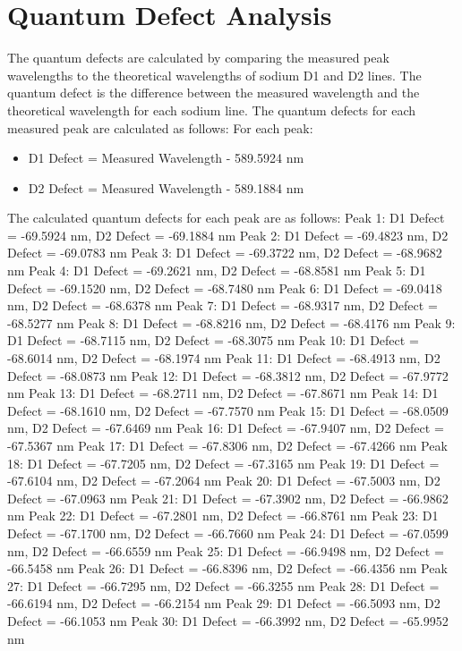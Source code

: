 \documentclass{article}
\begin{document}
\section*{Quantum Defect Analysis}
The quantum defects are calculated by comparing the measured peak wavelengths to the theoretical wavelengths of sodium D1 and D2 lines. The quantum defect is the difference between the measured wavelength and the theoretical wavelength for each sodium line. The quantum defects for each measured peak are calculated as follows:
For each peak:
\begin{itemize}
\item D1 Defect = Measured Wavelength - 589.5924 nm
\item D2 Defect = Measured Wavelength - 589.1884 nm
\end{itemize}
The calculated quantum defects for each peak are as follows:
Peak 1: D1 Defect = -69.5924 nm, D2 Defect = -69.1884 nm
Peak 2: D1 Defect = -69.4823 nm, D2 Defect = -69.0783 nm
Peak 3: D1 Defect = -69.3722 nm, D2 Defect = -68.9682 nm
Peak 4: D1 Defect = -69.2621 nm, D2 Defect = -68.8581 nm
Peak 5: D1 Defect = -69.1520 nm, D2 Defect = -68.7480 nm
Peak 6: D1 Defect = -69.0418 nm, D2 Defect = -68.6378 nm
Peak 7: D1 Defect = -68.9317 nm, D2 Defect = -68.5277 nm
Peak 8: D1 Defect = -68.8216 nm, D2 Defect = -68.4176 nm
Peak 9: D1 Defect = -68.7115 nm, D2 Defect = -68.3075 nm
Peak 10: D1 Defect = -68.6014 nm, D2 Defect = -68.1974 nm
Peak 11: D1 Defect = -68.4913 nm, D2 Defect = -68.0873 nm
Peak 12: D1 Defect = -68.3812 nm, D2 Defect = -67.9772 nm
Peak 13: D1 Defect = -68.2711 nm, D2 Defect = -67.8671 nm
Peak 14: D1 Defect = -68.1610 nm, D2 Defect = -67.7570 nm
Peak 15: D1 Defect = -68.0509 nm, D2 Defect = -67.6469 nm
Peak 16: D1 Defect = -67.9407 nm, D2 Defect = -67.5367 nm
Peak 17: D1 Defect = -67.8306 nm, D2 Defect = -67.4266 nm
Peak 18: D1 Defect = -67.7205 nm, D2 Defect = -67.3165 nm
Peak 19: D1 Defect = -67.6104 nm, D2 Defect = -67.2064 nm
Peak 20: D1 Defect = -67.5003 nm, D2 Defect = -67.0963 nm
Peak 21: D1 Defect = -67.3902 nm, D2 Defect = -66.9862 nm
Peak 22: D1 Defect = -67.2801 nm, D2 Defect = -66.8761 nm
Peak 23: D1 Defect = -67.1700 nm, D2 Defect = -66.7660 nm
Peak 24: D1 Defect = -67.0599 nm, D2 Defect = -66.6559 nm
Peak 25: D1 Defect = -66.9498 nm, D2 Defect = -66.5458 nm
Peak 26: D1 Defect = -66.8396 nm, D2 Defect = -66.4356 nm
Peak 27: D1 Defect = -66.7295 nm, D2 Defect = -66.3255 nm
Peak 28: D1 Defect = -66.6194 nm, D2 Defect = -66.2154 nm
Peak 29: D1 Defect = -66.5093 nm, D2 Defect = -66.1053 nm
Peak 30: D1 Defect = -66.3992 nm, D2 Defect = -65.9952 nm
\end{document}
